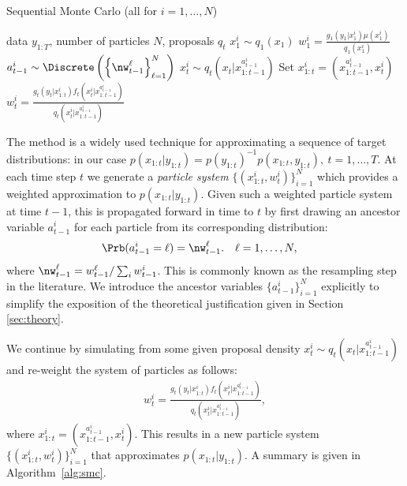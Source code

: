 %
%

\begin{algorithm}[tb]
	\caption{Sequential Monte Carlo \hfill {\small (all for $i=1,\ldots,N$)}}
	\label{alg:smc}
	\begin{spacing}{1.2}
		\begin{algorithmic}[1]
			\renewcommand{\algorithmicrequire}{\textbf{Inputs:}}
			\renewcommand{\algorithmicensure}{\textbf{Outputs:}}				 
			\Require  data $y_{1:T}$, number of particles $N$, proposals $q_t$
			\State $x_1^i \sim q_1(x_1)$
			\State $w_1^i = \frac{g_1(y_1|x_1^i) \mu(x_1^i)}{q_1(x_1^i)}$
			\State $a_{t-1}^i \sim \Discrete\left(\left\{\nw_{t-1}^{\ell}\right\}_{\ell=1}^N\right)$%
			\State $x_t^i \sim q_t(x_t | x_{1:t-1}^{a_{t-1}^i})$ 
			\State Set $x_{1:t}^i = (x_{1:t-1}^{a_{t-1}^i},x_t^i)$
			\State $w_t^i = \frac{g_t(y_t|x_{1:t}^i) f_t(x_t^i | x_{1:t-1}^{a_{t-1}^i})}{q_t(x_t^i|x_{1:t-1}^{a_{t-1}^i})}$
			\EndFor
		\end{algorithmic}
	\end{spacing}
\end{algorithm}

The \smc method is a widely used technique for approximating a sequence of target distributions: in our case $p(x_{1:t}|y_{1:t}) = p(y_{1:t})^{-1} p(x_{1:t},y_{1:t}), ~t=1,\ldots,T$. 
At each time step $t$ we 
generate a \emph{particle system}
$\{(x_{1:t}^i,w_{t}^i)\}_{i=1}^N$ which provides a weighted approximation  to $p(x_{1:t}|y_{1:t})$. Given such a weighted particle system at time $t-1$, this 
is propagated forward in time to $t$ by first drawing an ancestor variable $a_{t-1}^i$ for each particle from its corresponding distribution:
\begin{align}
\Prb(a_{t-1}^i = \ell) &= \nw_{t-1}^\ell.
&
\ell&=1,\ldots,N,
\end{align}
where $\nw_{t-1}^\ell = w_{t-1}^\ell / \sum_i w_{t-1}^i$. This is commonly known as the resampling step in the literature. We introduce the ancestor variables $\{a_{t-1}^i\}_{i=1}^N$ explicitly to simplify the exposition of the theoretical justification given in Section \ref{sec:theory}.

We continue by simulating from some given proposal density $x_t^i \sim q_t(x_t | x_{1:t-1}^{a_{t-1}^i})$ and re-weight the system of particles as follows:
\begin{align}
\label{eq:smcweights}
w_t^i = \frac{g_t(y_t|x_{1:t}^i) f_t(x_t^i | x_{1:t-1}^{a_{t-1}^i})}{q_t(x_t^i|x_{1:t-1}^{a_{t-1}^i})},
\end{align}
where $x_{1:t}^i = (x_{1:t-1}^{a_{t-1}^i},x_t^i)$. This results in a new particle system $\{(x_{1:t}^i,w_t^i)\}_{i=1}^N$ that approximates $p(x_{1:t}|y_{1:t})$. A summary is given in Algorithm~\ref{alg:smc}.

